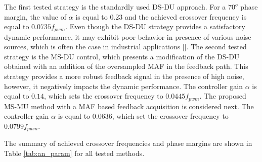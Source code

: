 \documentclass[journal]{IEEEtran}
\begin{document}
The first tested strategy is the standardly used DS-DU approach. For a $70^o$ phase margin, the value of $\alpha$ is equal to $0.23$ and the achieved crossover frequency is equal to $0.0735 f_{pwm}$. Even though the DS-DU strategy provides a satisfactory dynamic performance, it may exhibit poor behavior in presence of various noise sources, which is often the case in industrial applications [].
The second tested strategy is the MS-DU control, which presents a modification of the DS-DU obtained with an addition of the oversampled MAF in the feedback path. This strategy provides a more robust feedback signal in the presence of high noise, however, it negatively impacts  the dynamic performance. The controller gain $\alpha$ is equal to $0.14$, which sets the crossover frequency to $0.0445 f_{pwm}$.
The proposed MS-MU method with a MAF based feedback acquisition is considered next. 
The controller gain $\alpha$ is equal to $0.0636$, which set the crossover frequency to $0.0799  f_{pwm}$.

The summary of achieved crossover frequencies and phase margins are shown in Table \ref{tab:an_param} for all tested methods. 
\end{document}
